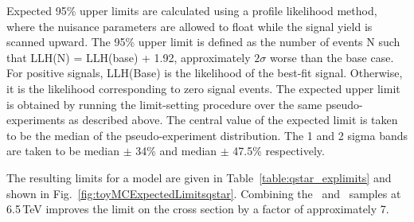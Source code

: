 Expected 95\% upper limits are calculated using a profile likelihood method, where the nuisance parameters are allowed 
to float while the signal yield is scanned upward.  The 95\% upper limit is defined as the number of events 
N such that LLH(N) = LLH(base) + 1.92, approximately $2\sigma$ worse than the base case. For positive signals, 
LLH(Base) is the likelihood of the best-fit signal.  Otherwise, it is the likelihood corresponding to zero signal 
events. The expected upper limit is obtained by running the limit-setting procedure over the same pseudo-experiments 
as described above. The central value of the expected limit is taken to be the median of the pseudo-experiment 
distribution. The 1 and 2 sigma bands are taken to be median $\pm$ 34\% and median $\pm$ 47.5\% respectively.

The resulting limits for a \qstar model are given in Table~\ref{table:qstar_explimits} and shown in Fig.~\ref{fig:toyMCExpectedLimitsqstar}.
Combining the \QQ\ and \QG\ samples at 6.5\,TeV improves the limit on the cross section by a factor of approximately 7.


